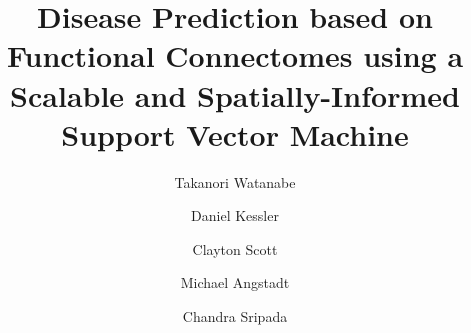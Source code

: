 \begin{frontmatter}
\title{Disease Prediction based on Functional Connectomes using a \\ Scalable and Spatially-Informed Support Vector Machine}
\author[eecs]{Takanori Watanabe}
\author[psych]{Daniel Kessler}
\author[eecs,stats]{Clayton Scott}
\author[psych]{Michael Angstadt}
\author[psych]{Chandra Sripada}

\address[eecs]{Department of Electrical Engineering and Computer Science, University of Michigan, Ann Arbor, MI, USA}

\address[stats]{Department of Statistics, University of Michigan, Ann Arbor, MI, USA}

\address[psych]{Department of Psychiatry, University of Michigan, Ann Arbor, MI, USA}



\end{frontmatter}
